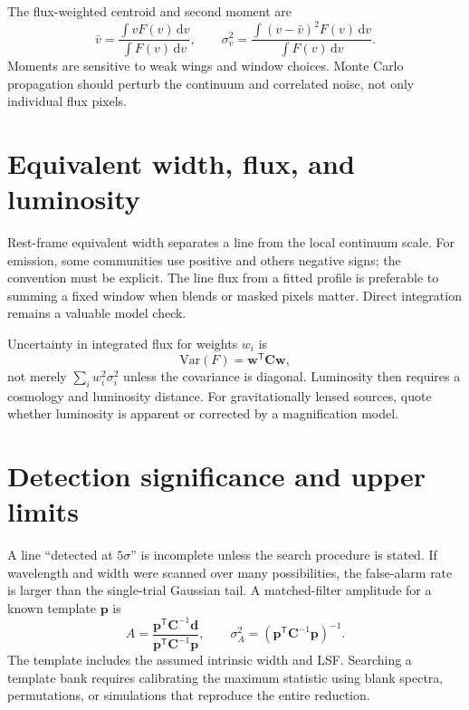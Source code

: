 The flux-weighted centroid and second moment are
\begin{equation}
 \bar v=\frac{\int vF(v)\,\mathrm{d}v}{\int F(v)\,\mathrm{d}v},
 \qquad
 \sigma_v^2=\frac{\int(v-\bar v)^2F(v)\,\mathrm{d}v}{\int F(v)\,\mathrm{d}v}.
 \label{eq:line-moments}
\end{equation}
Moments are sensitive to weak wings and window choices.  Monte Carlo propagation
should perturb the continuum and correlated noise, not only individual flux pixels.

\section{Equivalent width, flux, and luminosity}

Rest-frame equivalent width separates a line from the local continuum scale.  For
emission, some communities use positive and others negative signs; the convention
must be explicit.  The line flux from a fitted profile is preferable to summing a
fixed window when blends or masked pixels matter.  Direct integration remains a
valuable model check.

Uncertainty in integrated flux for weights $w_i$ is
\begin{equation}
 \mathrm{Var}(F)=\boldsymbol{w}^{\mathsf T}
 \boldsymbol{C}\boldsymbol{w},
 \label{eq:integrated-flux-covariance}
\end{equation}
not merely $\sum_i w_i^2\sigma_i^2$ unless the covariance is diagonal.  Luminosity
then requires a cosmology and luminosity distance.  For gravitationally lensed
sources, quote whether luminosity is apparent or corrected by a magnification model.

\section{Detection significance and upper limits}

A line ``detected at $5\sigma$'' is incomplete unless the search procedure is stated.
If wavelength and width were scanned over many possibilities, the false-alarm rate
is larger than the single-trial Gaussian tail.  A matched-filter amplitude for a
known template $\boldsymbol{p}$ is
\begin{equation}
 \widehat{A}=\frac{\boldsymbol{p}^{\mathsf T}
 \boldsymbol{C}^{-1}\boldsymbol{d}}
 {\boldsymbol{p}^{\mathsf T}\boldsymbol{C}^{-1}\boldsymbol{p}},
 \qquad
 \sigma_A^2=\left(\boldsymbol{p}^{\mathsf T}
 \boldsymbol{C}^{-1}\boldsymbol{p}\right)^{-1}.
 \label{eq:matched-filter}
\end{equation}
The template includes the assumed intrinsic width and LSF.  Searching a template bank
requires calibrating the maximum statistic using blank spectra, permutations, or
simulations that reproduce the entire reduction.


